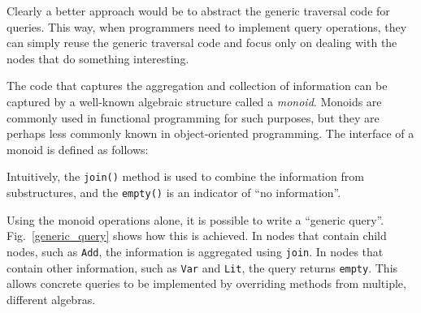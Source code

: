 Clearly a better approach would be to abstract the generic traversal
code for queries. This way, when programmers need to implement query
operations, they can simply reuse the generic traversal code and
focus only on dealing with the nodes that do something interesting.



The code that captures the aggregation and collection of information
can be captured by a well-known algebraic structure called a
\emph{monoid}. Monoids are commonly used in functional programming
for such purposes, but they are perhaps less commonly known in
object-oriented programming.  The interface of a monoid is defined as follows:
\begin{quote}
\end{quote}
Intuitively, the \lstinline{join()} method is
used to combine the information from substructures, and the
\lstinline{empty()} is an indicator of ``no information''.

Using the monoid operations alone, it is possible to write a ``generic
query''. Fig.~\ref{generic_query} shows how this is achieved. In
nodes that contain child nodes, such as \lstinline{Add}, the
information is aggregated using \lstinline{join}. In nodes that
contain other information, such as \lstinline{Var} and
\lstinline{Lit}, the query returns \lstinline{empty}.
This allows concrete queries to be implemented by overriding methods from multiple, different algebras.

